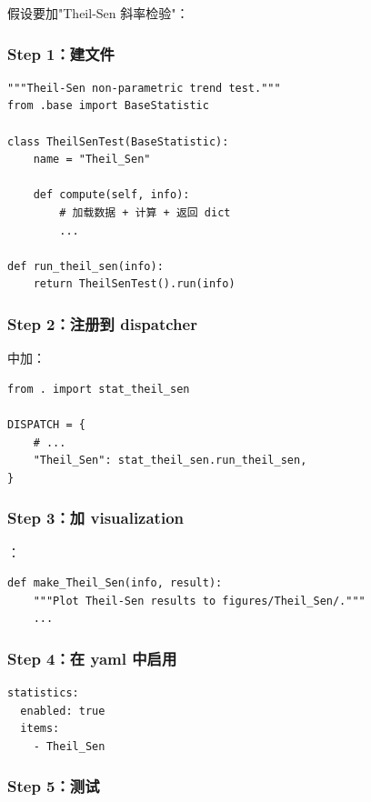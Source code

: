 假设要加"Theil-Sen 斜率检验"：

\subsubsection{Step 1：建文件 }

\begin{verbatim}
"""Theil-Sen non-parametric trend test."""
from .base import BaseStatistic

class TheilSenTest(BaseStatistic):
    name = "Theil_Sen"

    def compute(self, info):
        # 加载数据 + 计算 + 返回 dict
        ...

def run_theil_sen(info):
    return TheilSenTest().run(info)
\end{verbatim}

\subsubsection{Step 2：注册到 dispatcher}

 中加：

\begin{verbatim}
from . import stat_theil_sen

DISPATCH = {
    # ...
    "Theil_Sen": stat_theil_sen.run_theil_sen,
}
\end{verbatim}

\subsubsection{Step 3：加 visualization}

：

\begin{verbatim}
def make_Theil_Sen(info, result):
    """Plot Theil-Sen results to figures/Theil_Sen/."""
    ...
\end{verbatim}

\subsubsection{Step 4：在 yaml 中启用}

\begin{verbatim}
statistics:
  enabled: true
  items:
    - Theil_Sen
\end{verbatim}

\subsubsection{Step 5：测试}

